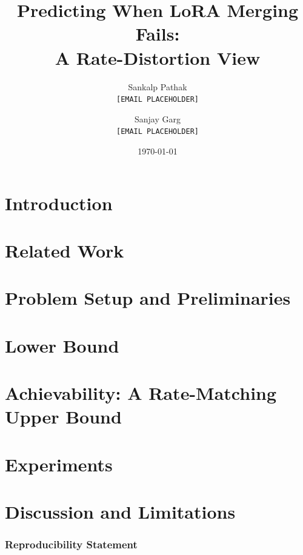 \documentclass[11pt]{article}
\title{Predicting When LoRA Merging Fails:\\A Rate-Distortion View}
\author{
Sankalp Pathak \\
\texttt{[EMAIL PLACEHOLDER]}
\and
Sanjay Garg \\
\texttt{[EMAIL PLACEHOLDER]}
}
\date{\today}
\theoremstyle{definition}
\theoremstyle{remark}
\begin{document}
\maketitle

\begin{abstract}

\end{abstract}

\section{Introduction}


\section{Related Work}\label{sec:related_work}


\section{Problem Setup and Preliminaries}\label{sec:setup}


\section{Lower Bound}\label{sec:lower}\label{sec:lower_bound}


\section{Achievability: A Rate-Matching Upper Bound}\label{sec:achv}\label{sec:achievability}


\section{Experiments}\label{sec:exp}\label{sec:experiments}


\section{Discussion and Limitations}\label{sec:discussion}\label{sec:future}


\subsubsection*{Reproducibility Statement}

\end{document}
